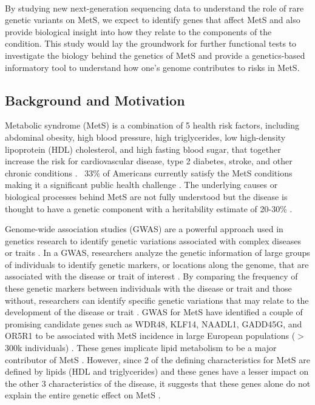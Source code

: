 \documentclass[11pt]{article}
\begin{document}
\

By studying new next-generation sequencing data to understand the role of rare genetic variants on MetS, we expect to identify genes that affect MetS and also provide biological insight into how they relate to the components of the condition. This study would lay the groundwork for further functional tests to investigate the biology behind the genetics of MetS and provide a genetics-based informatory tool to understand how one's genome contributes to risks in MetS.

\newpage

\subsection*{Background and Motivation}

Metabolic syndrome (MetS) is a combination of 5 health risk factors, including abdominal obesity, high blood pressure, high triglycerides, low high-density lipoprotein (HDL) cholesterol, and high fasting blood sugar, that together increase the risk for cardiovascular disease, type 2 diabetes, stroke, and other chronic conditions \cite{pmid29480368}. ~33\% of Americans currently satisfy the MetS conditions making it a significant public health challenge \cite{pmid29480368}. The underlying causes or biological processes behind MetS are not fully understood but the disease is thought to have a genetic component with a heritability estimate of 20-30\% \cite{Graziano2019}. 

Genome-wide association studies (GWAS) are a powerful approach used in genetics research to identify genetic variations associated with complex diseases or traits \cite{Uffelmann2021}. In a GWAS, researchers analyze the genetic information of large groups of individuals to identify genetic markers, or locations along the genome, that are associated with the disease or trait of interest \cite{Uffelmann2021}. By comparing the frequency of these genetic markers between individuals with the disease or trait and those without, researchers can identify specific genetic variations that may relate to the development of the disease or trait \cite{Uffelmann2021}. GWAS for MetS have identified a couple of promising candidate genes such as WDR48, KLF14, NAADL1, GADD45G, and OR5R1 to be associated with MetS incidence in large European populations ($>$300k individuals) \cite{pmid31589552}. These genes implicate lipid metabolism to be a major contributor of MetS \cite{pmid31589552}. However, since 2 of the defining characteristics for MetS are defined by lipids (HDL and triglycerides) and these genes have a lesser impact on the other 3 characteristics of the disease, it suggests that these genes alone do not explain the entire genetic effect on MetS \cite{pmid31589552}.
\end{document}

